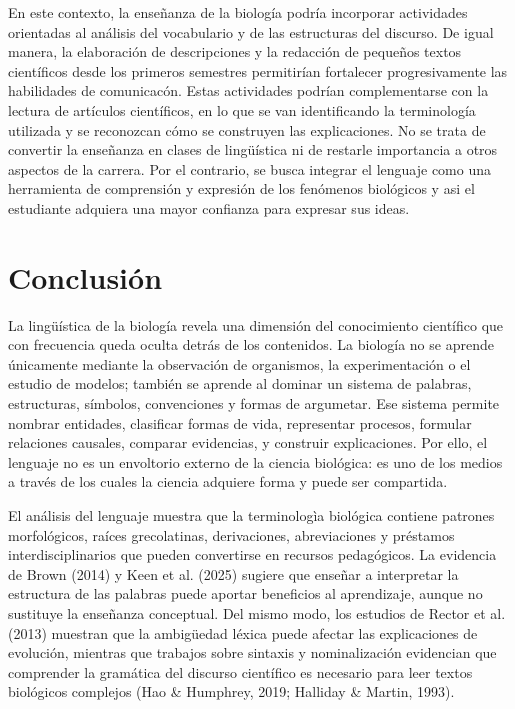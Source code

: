 \documentclass[12pt]{article}
\begin{document}
En este contexto, la enseñanza de la biología podría incorporar actividades orientadas al análisis del vocabulario y de las estructuras del discurso. De igual manera, la elaboración de descripciones y la redacción de pequeños textos científicos desde los primeros semestres permitirían fortalecer progresivamente las habilidades de comunicacón. Estas actividades podrían complementarse con la lectura de artículos científicos, en lo que se van identificando la terminología utilizada y se reconozcan cómo se construyen las explicaciones. 
No se trata de convertir la enseñanza en clases de lingüística ni de restarle importancia a otros aspectos de la carrera. Por el contrario, se busca integrar el lenguaje como una herramienta de comprensión y expresión de los fenómenos biológicos y asi el estudiante adquiera una mayor confianza para expresar sus ideas.

\section{Conclusión}
La lingüística de la biología revela una dimensión del conocimiento científico que con frecuencia queda oculta detrás de los contenidos. La biología no se aprende únicamente mediante la observación de organismos, la experimentación o el estudio de modelos; también se aprende al dominar un sistema de palabras, estructuras, símbolos, convenciones y formas de argumetar. Ese sistema permite nombrar entidades, clasificar formas de vida, representar procesos, formular relaciones causales, comparar evidencias, y construir explicaciones. Por ello, el lenguaje no es un envoltorio externo de la ciencia biológica: es uno de los medios a través de los cuales la ciencia adquiere forma y puede ser compartida.

El análisis del lenguaje muestra que la terminologìa biológica contiene patrones morfológicos, raíces grecolatinas, derivaciones, abreviaciones y préstamos interdisciplinarios que pueden convertirse en recursos pedagógicos. La evidencia de Brown (2014) y Keen et al. (2025) sugiere que enseñar a interpretar la estructura de las palabras puede aportar beneficios al aprendizaje, aunque no sustituye la enseñanza conceptual. Del mismo modo, los estudios de Rector et al. (2013) muestran que la ambigüedad léxica puede afectar las explicaciones de evolución, mientras que trabajos sobre sintaxis y nominalización evidencian que comprender la gramática del discurso científico es necesario para leer textos biológicos complejos (Hao & Humphrey, 2019; Halliday & Martin, 1993).
\end{document}
